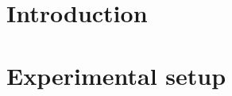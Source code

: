 \documentclass[final,5p,12pt,twocolumn]{elsaarticle}
\begin{document}
\maketitle
\clearpage

\section{Introduction}\label{introduction}


\section{Experimental setup}\label{setup}



\end{document}
